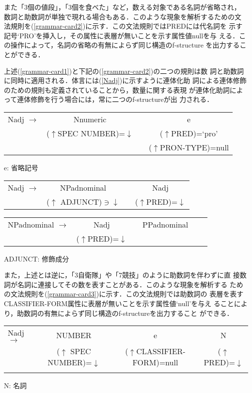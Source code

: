 \documentclass[japanese]{jnlp_1.4}
\begin{document}
また「3個の値段」，「3個を食べた」など，数える対象である名詞が省略され，
数詞と助数詞が単独で現れる場合もある．このような現象を解析するための文
法規則を(\ref{grammar-card2})に示す．この文法規則ではPREDには代名詞を
示す記号`PRO'を挿入し，その属性に表層が無いことを示す属性値nullを与
える．この操作によって，名詞の省略の有無によらず同じ構造のf-structure
を出力することができる．

上述(\ref{grammar-card1})と下記の(\ref{grammar-card2})の二つの規則は数
詞と助数詞に同時に適用される．体言には(\ref{Nadj})に示すように連体化助
詞による連体修飾のための規則も定義されていることから，数量に関する表現
が連体化助詞によって連体修飾を行う場合には，常に二つのf-structureが出
力される．

\begin{example}
\label{grammar-card2}
\begin{tabular}[t]{lccc}
Nadj $\longrightarrow$ & Nnumeric && e \\
&($\uparrow$SPEC NUMBER)=$\downarrow$ \hspace*{.3cm} &&($\uparrow$PRED)=`pro'\\
&&&($\uparrow$PRON-TYPE)=null\\[2ex]
\end{tabular}

e: 省略記号
\end{example}
\begin{example}
\label{Nadj}
\begin{tabular}[t]{lccc}
Nadj $\longrightarrow$ & NPadnominal && Nadj\\
&($\uparrow$ ADJUNCT)$\ni$$\downarrow$ \hspace*{.3cm} &&($\uparrow$PRED)=$\downarrow$\\[2ex]
\end{tabular}

\begin{tabular}[t]{lccccc}
NPadnominal $\longrightarrow$ & Nadj && PPadnominal\\
&($\uparrow$PRED)=$\downarrow$\hspace*{.3cm} &&\\[2ex]
\end{tabular}

ADJUNCT: 修飾成分
\end{example}
また，上述とは逆に，「3自衛隊」や「7競技」のように助数詞を伴わずに直
接数詞が名詞に連接してその数を表すことがある．このような現象を解析する
ための文法規則を(\ref{grammar-card3})に示す．この文法規則では助数詞の
表層を表すCLASSIFIER-FORM属性に表層が無いことを示す属性値`null'を与え
ることにより，助数詞の有無によらず同じ構造のf-structureを出力すること
ができる．
\begin{example}
\begin{tabular}[t]{lccc}
Nadj $\longrightarrow$ & NUMBER &e& N\\
&($\uparrow$ SPEC NUMBER)=$\downarrow$ \hspace*{.3cm} &($\uparrow$CLASSIFIER-FORM)=null&($\uparrow$PRED)=$\downarrow$\\
\label{grammar-card3}
\end{tabular}

N: 名詞
\end{example}
\end{document}
